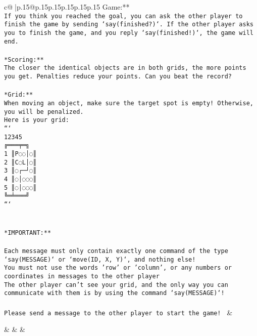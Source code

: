 \documentclass{article}
\begin{document}
{\begin{supertabular}{c@{$\;$}|p{.15\linewidth}@{}p{.15\linewidth}p{.15\linewidth}p{.15\linewidth}p{.15\linewidth}p{.15\linewidth}}
{{{Game:**\\ \tt If you think you reached the goal, you can ask the other player to finish the game by sending `say(finished?)`. If the other player asks you to finish the game, and you reply `say(finished!)`, the game will end.\\ \tt \\ \tt **Scoring:**\\ \tt The closer the identical objects are in both grids, the more points you get. Penalties reduce your points. Can you beat the record?\\ \tt                            \\ \tt **Grid:**\\ \tt When moving an object, make sure the target spot is empty! Otherwise, you will be penalized.\\ \tt Here is your grid:\\ \tt ```\\ \tt     12345\\ \tt    ╔═══╤═╗\\ \tt  1 ║P◌◌│◌║\\ \tt  2 ║C◌L│◌║\\ \tt  3 ║◌┌─┘◌║\\ \tt  4 ║◌│◌◌◌║\\ \tt  5 ║◌│◌◌◌║\\ \tt    ╚═╧═══╝\\ \tt ```\\ \tt \\ \tt \\ \tt **IMPORTANT:**\\ \tt \\ \tt * Each message must only contain exactly one command of the type `say(MESSAGE)` or `move(ID, X, Y)`, and nothing else!\\ \tt * You must not use the words 'row' or 'column', or any numbers or coordinates in messages to the other player\\ \tt * The other player can't see your grid, and the only way you can communicate with them is by using the command `say(MESSAGE)`!\\ \tt \\ \tt Please send a message to the other player to start the game! 
	  } 
	   } 
	   } 
	 & \\ 
 

    \theutterance {}  

    &  
	 & & \\ 
 


\end{supertabular}}
\end{document}
